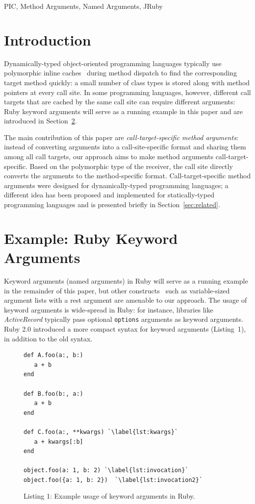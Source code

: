 \documentclass{sigplanconf} %
\begin{document}

\keywords
PIC, Method Arguments, Named Arguments, JRuby %

\section{Introduction}
Dynamically-typed object-oriented programming languages typically use polymorphic inline caches~\cite{Holzle:1991:ODO:646149.679193} during method dispatch to find the corresponding target method quickly: a small number of class types is stored along with method pointers at every call site. In some programming languages, however, different call targets that are cached by the same call site can require different arguments: Ruby keyword arguments will serve as a running example in this paper and are introduced in Section~\ref{sec:kwargs}. 

The main contribution of this paper are \emph{call-target-specific method arguments}: instead of converting arguments into a call-site-specific format and sharing them among all call targets, our approach aims to make method arguments call-target-specific. Based on the polymorphic type of the receiver, the call site directly converts the arguments to the method-specific format. Call-target-specific method arguments were designed for dynamically-typed programming languages; a different idea has been proposed and implemented for statically-typed programming languages and is presented briefly in Section~\ref{sec:related}.

\section{Example: Ruby Keyword Arguments}
\label{sec:kwargs}
Keyword arguments (named arguments) in Ruby will serve as a running example in the remainder of this paper, but other constructs~\cite{Zdun05patternsof} such as variable-sized argument lists with a rest argument are amenable to our approach. The usage of keyword arguments is wide-spread in Ruby: for instance, libraries like \emph{ActiveRecord} typically pass optional \lstinline{options} arguments as keyword arguments. Ruby 2.0 introduced a more compact syntax for keyword arguments (Listing~1), in addition to the old syntax. 

\begin{figure}[!hbp] %
\begin{lstlisting}[basicstyle=\footnotesize\ttfamily] 
def A.foo(a:, b:)
   a + b
end

def B.foo(b:, a:)
   a + b
end

def C.foo(a:, **kwargs) `\label{lst:kwargs}`
   a + kwargs[:b]
end

object.foo(a: 1, b: 2) `\label{lst:invocation}`
object.foo({a: 1, b: 2})  `\label{lst:invocation2}`
\end{lstlisting}
\vspace{-0.25cm}
\caption*{Listing 1: Example usage of keyword arguments in Ruby.}
\end{figure}
\end{document}
